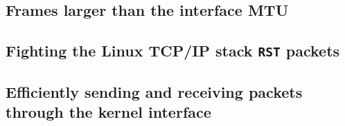 \documentclass[11pt,a4paper,british]{bhamarticle}
\begin{document}
\begin{multicols}{2}
\subsection{Frames larger than the interface MTU}

\subsection{Fighting the Linux TCP/IP stack \texttt{RST} packets}

\subsection{Efficiently sending and receiving packets through the kernel interface}
\cite{tpacket} %


\printbibliography %
\end{multicols}
\end{document}
